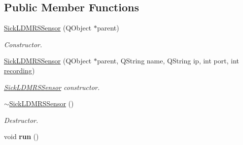 \subsection*{Public Member Functions}
\begin{DoxyCompactItemize}
\item 
\hypertarget{classpacpus_1_1SickLDMRSSensor_a0af00a3cf38fe5ae6a71038af4eb2a35}{\hyperlink{classpacpus_1_1SickLDMRSSensor_a0af00a3cf38fe5ae6a71038af4eb2a35}{Sick\-L\-D\-M\-R\-S\-Sensor} (Q\-Object $\ast$parent)}\label{classpacpus_1_1SickLDMRSSensor_a0af00a3cf38fe5ae6a71038af4eb2a35}

\begin{DoxyCompactList}\small\item\em Constructor. \end{DoxyCompactList}\item 
\hyperlink{classpacpus_1_1SickLDMRSSensor_a33518ebb2123cb2bccc68dfe1911769a}{Sick\-L\-D\-M\-R\-S\-Sensor} (Q\-Object $\ast$parent, Q\-String name, Q\-String ip, int port, int \hyperlink{classpacpus_1_1AbstractSickSensor_a2cefb63d92089cab86f874a3390acb28}{recording})
\begin{DoxyCompactList}\small\item\em \hyperlink{classpacpus_1_1SickLDMRSSensor}{Sick\-L\-D\-M\-R\-S\-Sensor} constructor. \end{DoxyCompactList}\item 
\hypertarget{classpacpus_1_1SickLDMRSSensor_af96ae9367377749421b5a541b107f83b}{\hyperlink{classpacpus_1_1SickLDMRSSensor_af96ae9367377749421b5a541b107f83b}{$\sim$\-Sick\-L\-D\-M\-R\-S\-Sensor} ()}\label{classpacpus_1_1SickLDMRSSensor_af96ae9367377749421b5a541b107f83b}

\begin{DoxyCompactList}\small\item\em Destructor. \end{DoxyCompactList}\item 
\hypertarget{classpacpus_1_1SickLDMRSSensor_a8579829420ffd7a6e9e85d2ae7adaea4}{void {\bfseries run} ()}\label{classpacpus_1_1SickLDMRSSensor_a8579829420ffd7a6e9e85d2ae7adaea4}


\end{DoxyCompactItemize}
